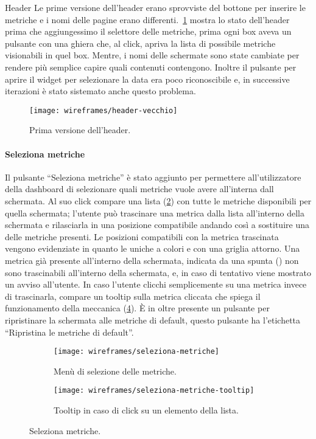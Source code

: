 \begin{bclogo}{Header}
Le prime versione dell'header erano sprovviste del bottone per inserire le metriche e i nomi delle pagine erano differenti.~\ref{fig:header-vecchio} mostra lo stato dell'header prima che aggiungessimo il selettore delle metriche, prima ogni box aveva un pulsante con una ghiera che, al click, apriva la lista di possibile metriche visionabili in quel box. Mentre, i nomi delle schermate sono state cambiate per rendere più semplice capire quali contenuti contengono.
Inoltre il pulsante per aprire il widget per selezionare la data era poco riconoscibile e, in successive iterazioni è stato sistemato anche questo problema.
\begin{figure}[H]
    \centering
    \texttt{[image: wireframes/header-vecchio]}
    \caption{Prima versione dell'header.}\label{fig:header-vecchio}
\end{figure}
\end{bclogo}

\paragraph{Seleziona metriche}
Il pulsante ``Seleziona metriche'' è stato aggiunto per permettere all'utilizzatore della dashboard di selezionare quali metriche vuole avere all'interna dall schermata. Al suo click compare una lista (\ref{fig:seleziona-metriche}) con tutte le metriche disponibili per quella schermata; l'utente può trascinare una metrica dalla lista all'interno della schermata e rilasciarla in una posizione compatibile andando così a sostituire una delle metriche presenti. Le posizioni compatibili con la metrica trascinata vengono evidenziate in quanto le uniche a colori e con una griglia attorno. Una metrica già presente all'interno della schermata, indicata da una spunta (\checkmark) non sono trascinabili all'interno della schermata, e, in caso di tentativo viene mostrato un avviso all'utente. In caso l'utente clicchi semplicemente su una metrica invece di trascinarla, compare un tooltip sulla metrica cliccata che spiega il funzionamento della meccanica (\ref{fig:seleziona-metriche-tooltip}). \`E in oltre presente un pulsante per ripristinare la schermata alle metriche di default, questo pulsante ha l'etichetta ``Ripristina le metriche di default''.

\begin{figure}[H]
    \begin{subfigure}[b]{0.5\textwidth}
        \centering
        \texttt{[image: wireframes/seleziona-metriche]}
        \caption{Menù di selezione delle metriche.}\label{fig:seleziona-metriche}
    \end{subfigure}
\hfill
    \begin{subfigure}[b]{0.5\textwidth}
        \centering
        \texttt{[image: wireframes/seleziona-metriche-tooltip]}
        \caption{Tooltip in caso di click su un elemento della lista.}\label{fig:seleziona-metriche-tooltip}
    \end{subfigure}
    \caption{Seleziona metriche.}
\end{figure}


